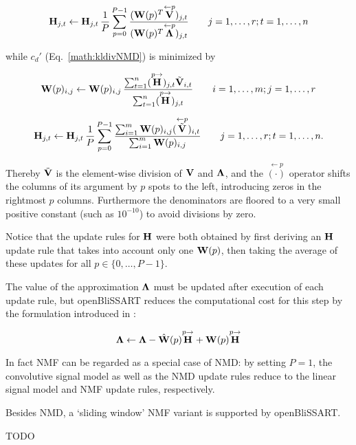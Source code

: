 \begin{equation}
    \label{math:EDHUpdateRuleNMD}
    \mathbf{H}_{j,t} \leftarrow \mathbf{H}_{j,t} \, \frac{1}{P} \sum\limits_{p=0}^{P-1} 
    \frac{( \mathbf{W}(p)^T \overset{\leftarrow p}{\mathbf{V}} )_{j,t}}
         {( \mathbf{W}(p)^T \overset{\leftarrow p}{\mathbf{\Lambda}} )_{j,t}}
    \qquad
    j = 1, \dots, r; t = 1, \dots, n
\end{equation}

\noindent while $c_d'$ (Eq.~\ref{math:kldivNMD}) is minimized by

\begin{equation}
    \label{math:KLWUpdateRuleNMD}
    \mathbf{W}(p)_{i,j} \leftarrow \mathbf{W}(p)_{i,j} \,
    \frac{\sum_{t=1}^n (\overset{p\rightarrow}{\mathbf{H}})_{j,t} \tilde{\mathbf{V}}_{i,t}}
         {\sum_{t=1}^n (\overset{p\rightarrow}{\mathbf{H}})_{j,t}}
    \qquad
     i = 1, \dots, m; j = 1, \dots, r 
\end{equation}

\begin{equation}
    \label{math:KLHUpdateRuleNMD}
    \mathbf{H}_{j,t} \leftarrow \mathbf{H}_{j,t} \, \frac{1}{P} \sum\limits_{p=0}^{P-1} 
    \frac{\sum_{i=1}^m \mathbf{W}(p)_{i,j} (\overset{\leftarrow p}{\tilde{\mathbf{V}}})_{i,t}}
         {\sum_{i=1}^m \mathbf{W}(p)_{i,j}}
    \qquad
    j = 1, \dots, r; t = 1, \dots, n .
\end{equation}

Thereby $\tilde{\mathbf{V}}$ is the element-wise division of $\mathbf{V}$ and
$\mathbf{\Lambda}$, and the $\overset{\leftarrow p}{(\cdot)}$ operator shifts the
columns of its argument by $p$ spots to the left, introducing zeros in the
rightmost $p$ columns. Furthermore the denominators are floored to a very small
positive constant (such as $10^{-10}$) to avoid divisions by zero.

Notice that the update rules for $\mathbf{H}$ were both obtained by first deriving
an $\mathbf{H}$ update rule that takes into account only one $\mathbf{W}(p)$, then
taking the average of these updates for all $p \in \{0, \dots, P-1\}$. 

The value of the approximation $\mathbf{\Lambda}$ must be updated after execution
of each update rule, but openBliSSART reduces the computational cost for this step by the formulation introduced in \cite{WangNMD2009}:

\begin{equation}
    \label{math:LambdaUpdate}
    \mathbf{\Lambda} \leftarrow \mathbf{\Lambda} - \hat{\mathbf{W}}(p) \overset{p \rightarrow}{\mathbf{H}} + \mathbf{W}(p) \overset{p \rightarrow}{\mathbf{H}}
\end{equation}

In fact NMF can be regarded as a special case of NMD: by setting $P=1$, the
convolutive signal model as well as the NMD update rules reduce to the linear
signal model and NMF update rules, respectively.

Besides NMD, a `sliding window' NMF variant is supported by openBliSSART.

TODO

